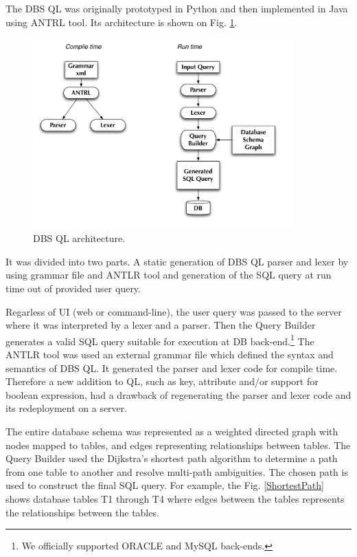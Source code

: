 \documentclass[a4paper]{jpconf}
\begin{document}
The DBS QL was originally prototyped in Python and then implemented
in Java using ANTRL tool. Its architecture is shown on Fig. \ref{DBS_QL}.
\begin{figure}[htb]
\centering
\includegraphics[width=100mm]{DBS_QL_architecture.pdf}
\caption{DBS QL architecture.}
\label{DBS_QL}
\end{figure}
It was divided into two parts. A static generation of DBS QL
parser and lexer by using grammar file and ANTLR tool\cite{ANTLR}
and generation of the SQL query at run time out of provided user query.

Regarless of UI (web or command-line), the user query was 
passed to the server where it was interpreted by a lexer and a parser.
Then the Query Builder generates a valid SQL query suitable for
execution at DB back-end.\footnote{We officially supported ORACLE and
MySQL back-ends.} 
The ANTLR tool was used an external grammar file which defined 
the syntax and semantics of DBS QL. It generated the parser and lexer 
code for compile time. Therefore a new addition to QL, such as key,
attribute and/or support for boolean expression, had a drawback of
regenerating the parser and lexer code and its redeployment on a server.
 
The entire database schema was represented as a weighted
directed graph with nodes mapped to tables, and edges 
representing relationships between tables. The Query Builder
used the Dijkstra’s shortest path algorithm to determine a 
path from one table to another and resolve multi-path ambiguities.
The chosen path is used to construct the final SQL query. 
For example, the Fig. \ref{ShortestPath} shows database tables 
T1 through T4  where edges between the tables represents the 
relationships between the tables.
\end{document}

